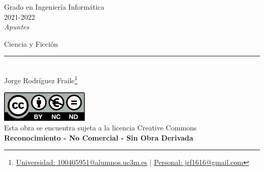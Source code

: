 \documentclass[12pt, twoside, openright]{report} %
\begin{document}

\begin{titlepage}
	\begin{sffamily}
		\color{azulUC3M}
		\begin{center}
			\begin{figure}[H] %
			\end{figure}
			\vspace{2.5cm}
			\begin{Large}
				Grado en Ingeniería Informática\\
				2021-2022\\
				\vspace{2cm}
				\textsl{Apuntes}\\
				\bigskip
			\end{Large}
			{\Huge Ciencia y Ficción}\\
			\vspace*{0.5cm}
			\rule{10.5cm}{0.1mm}\\
			\vspace*{0.9cm}
			{\LARGE Jorge Rodríguez Fraile\footnote{\href{mailto:100405951@alumnos.uc3m.es}{Universidad: 100405951@alumnos.uc3m.es}  |  \href{mailto:jrf1616@gmail.com}{Personal: jrf1616@gmail.com}}}\\
			\vspace*{1cm}
		\end{center}
		\vfill
		\color{black}
		\includegraphics[width=4.2cm]{img/creativecommons.png}\\
		Esta obra se encuentra sujeta a la licencia Creative Commons\\ \textbf{Reconocimiento - No Comercial - Sin Obra Derivada}
	\end{sffamily}
\end{titlepage}


\tableofcontents
\thispagestyle{fancy}
\end{document}
